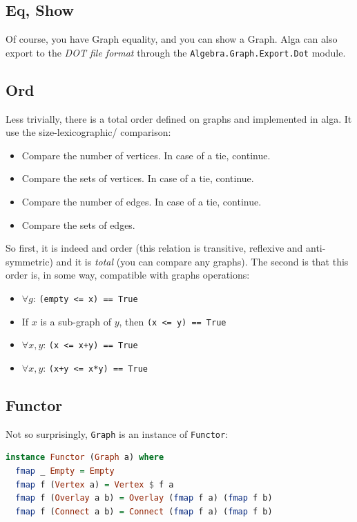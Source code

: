 \documentclass[10pt,a4paper]{article}
\begin{document}
\subsection{Eq, Show}
Of course, you have Graph equality, and you can show a Graph. Alga can also export to the \emph{DOT file format} through the \verb|Algebra.Graph.Export.Dot| module.

\subsection{Ord}
Less trivially, there is a total order defined on graphs and implemented in alga. It use the size-lexicographic/ comparison:
\begin{itemize}
	\item Compare the number of vertices. In case of a tie, continue.
	\item Compare the sets of vertices. In case of a tie, continue.
	\item Compare the number of edges. In case of a tie, continue.
	\item Compare the sets of edges.
\end{itemize}

So first, it is indeed and order (this relation is transitive, reflexive and anti-symmetric) and it is \emph{total} (you can compare any graphs). The second is that this order is, in some way, compatible with graphs operations:

\begin{itemize}
	\item $\forall g$: \verb|(empty <= x) == True|
	\item If $x$ is a sub-graph of $y$, then \verb|(x <= y) == True|
	\item $\forall x, y$: \verb|(x <= x+y) == True|
	\item $\forall x, y$: \verb|(x+y <= x*y) == True|
\end{itemize}

\subsection{Functor}
Not so surprisingly, \verb|Graph| is an instance of \verb|Functor|:
\begin{lstlisting}[language=Haskell, frame=single]
instance Functor (Graph a) where
  fmap _ Empty = Empty
  fmap f (Vertex a) = Vertex $ f a
  fmap f (Overlay a b) = Overlay (fmap f a) (fmap f b)
  fmap f (Connect a b) = Connect (fmap f a) (fmap f b)
\end{lstlisting}
\end{document}
